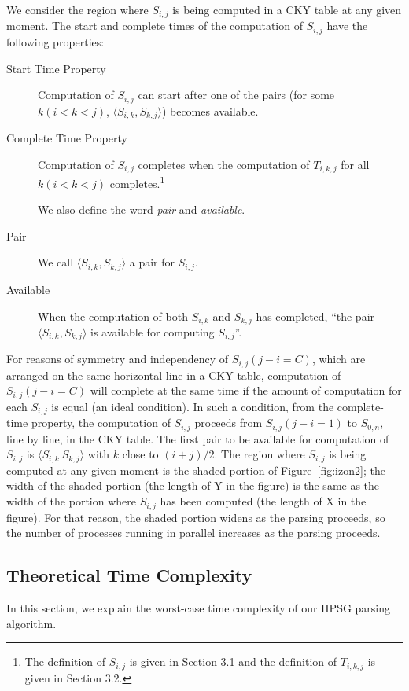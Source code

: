   We consider the region where $S_{i,j}$ is being computed in a CKY
table at any given moment.  The start and complete times of the
computation of $S_{i,j}$ have the following properties:

\begin{description}
\item [Start Time Property] Computation of $S_{i,j}$ can start after
one of the pairs (for some $k(i < k < j)$, $\langle
S_{i,k},S_{k,j}\rangle$) becomes available.
\item [Complete Time Property] Computation of $S_{i,j}$ completes when
the computation of $T_{i,k,j}$ for all $k(i < k < j)$
completes.\footnote{The definition of $S_{i,j}$ is given in Section
3.1 and the definition of $T_{i,k,j}$ is given in Section 3.2.}

 We also define the word {\it pair} and {\it available}.

\item [Pair] We call $\langle S_{i,k}, S_{k,j}\rangle$ a pair for $S_{i,j}$.
\item [Available] When the computation of both $S_{i,k}$ and $S_{k,j}$
has completed, ``the pair $\langle S_{i,k}, S_{k,j}\rangle$ is
available for computing $S_{i,j}$''.
\end{description}

For reasons of symmetry and independency of $S_{i,j} (j - i = C)$,
which are arranged on the same horizontal line in a CKY table,
computation of $S_{i,j} (j - i = C)$ will complete at the same time if
the amount of computation for each $S_{i,j}$ is equal (an ideal
condition).  In such a condition, from the complete-time property, the
computation of $S_{i,j}$ proceeds from $S_{i,j}(j-i = 1)$ to
$S_{0,n}$, line by line, in the CKY table.  The first pair to be
available for computation of $S_{i,j}$ is $\langle S_{i,k} ~ S_{k,j}
\rangle$ with $k$ close to $(i + j) /2$.  The region where $S_{i,j}$
is being computed at any given moment is the shaded portion of
Figure~\ref{fig:izon2}; the width of the shaded portion (the length of
Y in the figure) is the same as the width of the portion where
$S_{i,j}$ has been computed (the length of X in the figure).  For that
reason, the shaded portion widens as the parsing proceeds, so the
number of processes running in parallel increases as the parsing
proceeds.

\subsection{Theoretical Time Complexity}
  In this section, we explain the worst-case time complexity of our
HPSG parsing algorithm.


